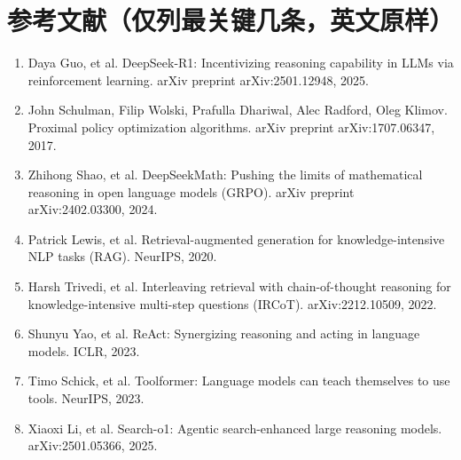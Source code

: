\documentclass[11pt,UTF8,fontset=fandol]{ctexart}
\begin{document}
\section*{参考文献（仅列最关键几条，英文原样）}
\small
\begin{enumerate}[leftmargin=2em]
\item Daya Guo, et al. DeepSeek-R1: Incentivizing reasoning capability in LLMs via reinforcement learning. arXiv preprint arXiv:2501.12948, 2025.
\item John Schulman, Filip Wolski, Prafulla Dhariwal, Alec Radford, Oleg Klimov. Proximal policy optimization algorithms. arXiv preprint arXiv:1707.06347, 2017.
\item Zhihong Shao, et al. DeepSeekMath: Pushing the limits of mathematical reasoning in open language models (GRPO). arXiv preprint arXiv:2402.03300, 2024.
\item Patrick Lewis, et al. Retrieval-augmented generation for knowledge-intensive NLP tasks (RAG). NeurIPS, 2020.
\item Harsh Trivedi, et al. Interleaving retrieval with chain-of-thought reasoning for knowledge-intensive multi-step questions (IRCoT). arXiv:2212.10509, 2022.
\item Shunyu Yao, et al. ReAct: Synergizing reasoning and acting in language models. ICLR, 2023.
\item Timo Schick, et al. Toolformer: Language models can teach themselves to use tools. NeurIPS, 2023.
\item Xiaoxi Li, et al. Search-o1: Agentic search-enhanced large reasoning models. arXiv:2501.05366, 2025.
\end{enumerate}
\end{document}
